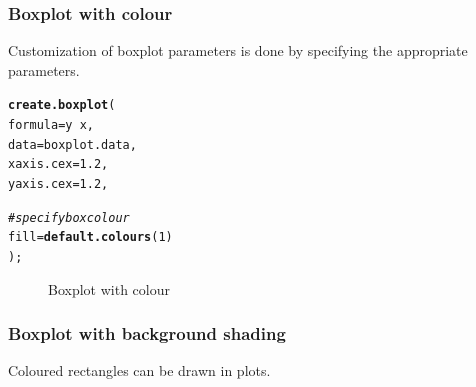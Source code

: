 \documentclass[letterpaper]{report}\usepackage[]{graphicx}\usepackage[]{color}
\makeatletter
\newcommand{\hlnum}[1]{\textcolor[rgb]{0.686,0.059,0.569}{#1}}%
\newcommand{\hlcom}[1]{\textcolor[rgb]{0.678,0.584,0.686}{\textit{#1}}}%
\newcommand{\hlopt}[1]{\textcolor[rgb]{0,0,0}{#1}}%
\newcommand{\hlstd}[1]{\textcolor[rgb]{0.345,0.345,0.345}{#1}}%
\newcommand{\hlkwc}[1]{\textcolor[rgb]{0.333,0.667,0.333}{#1}}%
\newcommand{\hlkwd}[1]{\textcolor[rgb]{0.737,0.353,0.396}{\textbf{#1}}}%
\newenvironment{kframe}{%
 \def\at@end@of@kframe{}%
 \ifinner\ifhmode%
  \def\at@end@of@kframe{\end{minipage}}%
  \begin{minipage}{\columnwidth}%
 \fi\fi%
 \def\FrameCommand##1{\hskip\@totalleftmargin \hskip-\fboxsep
 \colorbox{shadecolor}{##1}\hskip-\fboxsep
     \hskip-\linewidth \hskip-\@totalleftmargin \hskip\columnwidth}%
 \MakeFramed {\advance\hsize-\width
   \@totalleftmargin\z@ \linewidth\hsize
   \@setminipage}}%
 {\par\unskip\endMakeFramed%
 \at@end@of@kframe}
\newenvironment{knitrout}{}{} %
\makeatother
\begin{document}
\subsubsection{Boxplot with colour}
Customization of boxplot parameters is done by specifying the appropriate parameters.
\begin{knitrout}
\color{fgcolor}\begin{kframe}
\begin{alltt}
\hlkwd{create.boxplot}\hlstd{(}
    \hlkwc{formula} \hlstd{= y} \hlopt{~} \hlstd{x,}
    \hlkwc{data} \hlstd{= boxplot.data,}
    \hlkwc{xaxis.cex} \hlstd{=} \hlnum{1.2}\hlstd{,}
    \hlkwc{yaxis.cex} \hlstd{=} \hlnum{1.2}\hlstd{,}

    \hlcom{# specify box colour}
    \hlkwc{fill} \hlstd{=} \hlkwd{default.colours}\hlstd{(}\hlnum{1}\hlstd{)}
    \hlstd{);}
\end{alltt}
\end{kframe}\begin{figure}

{\centering {} 

}

\caption[Boxplot with colour]{Boxplot with colour\label{fig:boxplot2}}
\end{figure}


\end{knitrout}

\subsubsection{Boxplot with background shading}
Coloured rectangles can be drawn in plots.
\end{document}
